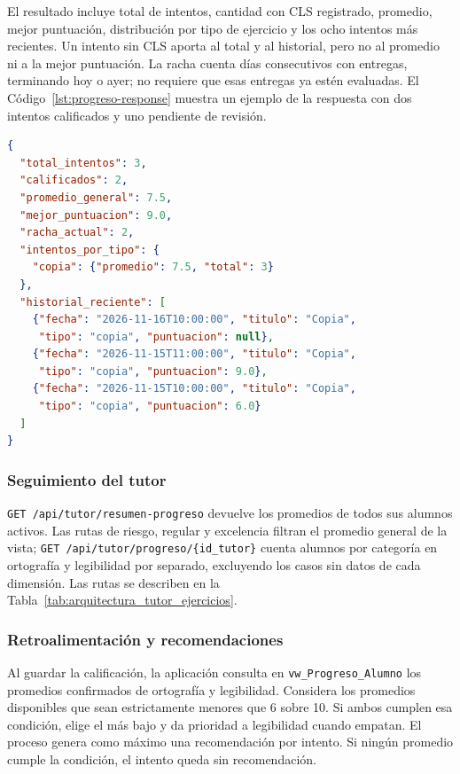 El resultado incluye total de intentos, cantidad con CLS registrado, promedio, mejor puntuación, distribución por tipo de ejercicio y los ocho intentos más recientes. Un intento sin CLS aporta al total y al historial, pero no al promedio ni a la mejor puntuación. La racha cuenta días consecutivos con entregas, terminando hoy o ayer; no requiere que esas entregas ya estén evaluadas. El Código~\ref{lst:progreso-response} muestra un ejemplo de la respuesta con dos intentos calificados y uno pendiente de revisión.

\noindent\begin{minipage}{\linewidth}
\begin{lstlisting}[language=JSON, caption={Ejemplo ilustrativo del resumen individual}, label={lst:progreso-response}]
{
  "total_intentos": 3,
  "calificados": 2,
  "promedio_general": 7.5,
  "mejor_puntuacion": 9.0,
  "racha_actual": 2,
  "intentos_por_tipo": {
    "copia": {"promedio": 7.5, "total": 3}
  },
  "historial_reciente": [
    {"fecha": "2026-11-16T10:00:00", "titulo": "Copia",
     "tipo": "copia", "puntuacion": null},
    {"fecha": "2026-11-15T11:00:00", "titulo": "Copia",
     "tipo": "copia", "puntuacion": 9.0},
    {"fecha": "2026-11-15T10:00:00", "titulo": "Copia",
     "tipo": "copia", "puntuacion": 6.0}
  ]
}
\end{lstlisting}
\end{minipage}

\subsubsection{Seguimiento del tutor}
\texttt{GET /api/tutor/resumen-progreso} devuelve los promedios de todos sus alumnos activos. Las rutas de riesgo, regular y excelencia filtran el promedio general de la vista; \texttt{GET /api/tutor/progreso/\{id\_tutor\}} cuenta alumnos por categoría en ortografía y legibilidad por separado, excluyendo los casos sin datos de cada dimensión. Las rutas se describen en la Tabla~\ref{tab:arquitectura_tutor_ejercicios}.

\subsubsection{Retroalimentación y recomendaciones}
\label{sec:diseno-recomendaciones}

Al guardar la calificación, la aplicación consulta en \texttt{vw\_Progreso\_Alumno} los promedios confirmados de ortografía y legibilidad. Considera los promedios disponibles que sean estrictamente menores que 6 sobre 10. Si ambos cumplen esa condición, elige el más bajo y da prioridad a legibilidad cuando empatan. El proceso genera como máximo una recomendación por intento. Si ningún promedio cumple la condición, el intento queda sin recomendación.

